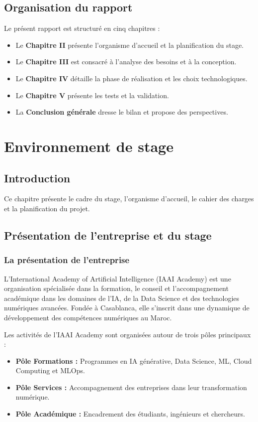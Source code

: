 \documentclass[12pt, a4paper]{report}
\begin{document}
\section{Organisation du rapport}
Le présent rapport est structuré en cinq chapitres :
\begin{itemize}
    \item Le \textbf{Chapitre II} présente l'organisme d'accueil et la planification du stage.
    \item Le \textbf{Chapitre III} est consacré à l'analyse des besoins et à la conception.
    \item Le \textbf{Chapitre IV} détaille la phase de réalisation et les choix technologiques.
    \item Le \textbf{Chapitre V} présente les tests et la validation.
    \item La \textbf{Conclusion générale} dresse le bilan et propose des perspectives.
\end{itemize}

\chapter{Environnement de stage}
\section{Introduction}
Ce chapitre présente le cadre du stage, l'organisme d'accueil, le cahier des charges et la planification du projet.

\section{Présentation de l'entreprise et du stage}
\subsection{La présentation de l'entreprise}
L'International Academy of Artificial Intelligence (IAAI Academy) est une organisation spécialisée dans la formation, le conseil et l'accompagnement académique dans les domaines de l'IA, de la Data Science et des technologies numériques avancées. Fondée à Casablanca, elle s'inscrit dans une dynamique de développement des compétences numériques au Maroc.

Les activités de l'IAAI Academy sont organisées autour de trois pôles principaux :
\begin{itemize}
    \item \textbf{Pôle Formations :} Programmes en IA générative, Data Science, ML, Cloud Computing et MLOps.
    \item \textbf{Pôle Services :} Accompagnement des entreprises dans leur transformation numérique.
    \item \textbf{Pôle Académique :} Encadrement des étudiants, ingénieurs et chercheurs.
\end{itemize}
\end{document}

